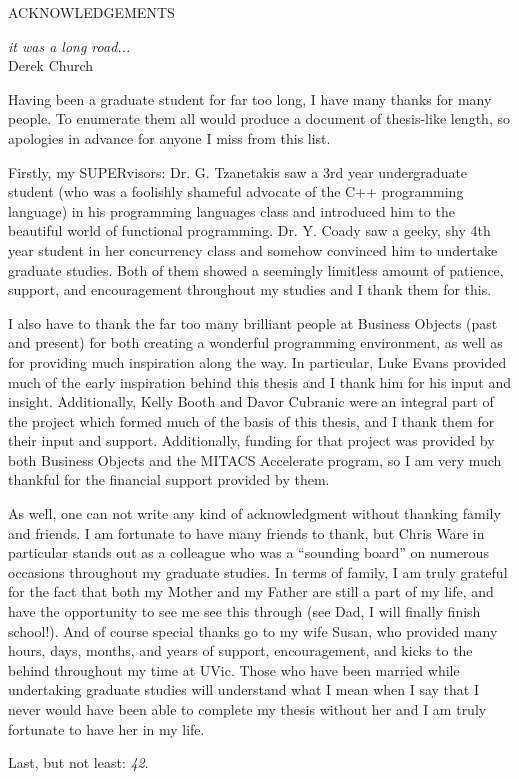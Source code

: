 \newpage
{}

\begin{center}
ACKNOWLEDGEMENTS
\end{center}

\begin{flushright}
\textit{it was a long road...}
\\
Derek Church \cite{Church06}\\
\end{flushright}

Having been a graduate student for far too long, I have many thanks for many people.  To enumerate them all would produce a document of thesis-like length, so apologies in advance for anyone I miss from this list.

Firstly, my SUPERvisors: Dr. G. Tzanetakis saw a 3rd year undergraduate student (who was a foolishly shameful advocate of the C++ programming language) in his programming languages class and introduced him to the beautiful world of functional programming.  Dr. Y. Coady saw a geeky, shy 4th year student in her concurrency class and somehow convinced him to undertake graduate studies.  Both of them showed a seemingly limitless amount of patience, support, and encouragement throughout my studies and I thank them for this.

I also have to thank the far too many brilliant people at Business Objects (past and present) for both creating a wonderful programming environment, as well as for providing much inspiration along the way.  In particular, Luke Evans provided much of the early inspiration behind this thesis and I thank him for his input and insight.  Additionally, Kelly Booth and Davor Cubranic were an integral part of the project which formed much of the basis of this thesis, and I thank them for their input and support.  Additionally, funding for that project was provided by both Business Objects and the MITACS Accelerate program, so I am very much thankful for the financial support provided by them.

As well, one can not write any kind of acknowledgment without thanking family and friends.  I am fortunate to have many friends to thank, but Chris Ware in particular stands out as a colleague who was a ``sounding board'' on numerous occasions throughout my graduate studies.  In terms of family, I am truly grateful for the fact that both my Mother and my Father are still a part of my life, and have the opportunity to see me see this through (see Dad, I will finally finish school!).  And of course special thanks go to my wife Susan, who provided many hours, days, months, and years of support, encouragement, and kicks to the behind throughout my time at UVic.  Those who have been married while undertaking graduate studies will understand what I mean when I say that I never would have been able to complete my thesis without her and I am truly fortunate to have her in my life.

Last, but not least: \emph{42}.
